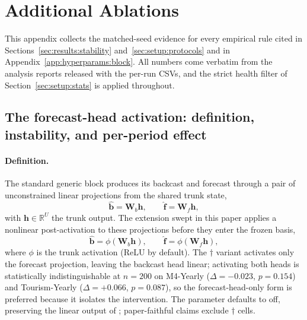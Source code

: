 %
%

\section{Additional Ablations}
\label{app:ablations}

This appendix collects the matched-seed evidence for every empirical rule
cited in Sections~\ref{sec:results:stability}
and~\ref{sec:setup:protocols} and in Appendix~\ref{app:hyperparams:block}.
All numbers come verbatim from the analysis reports released with the
per-run CSVs, and the strict health filter of
Section~\ref{sec:setup:stats} is applied throughout.

\subsection{The forecast-head activation: definition, instability, and
per-period effect}
\label{app:ablations:activeg}

\paragraph{Definition.} The standard generic block produces its backcast
and forecast through a pair of unconstrained linear projections from the
shared trunk state,
\[
  \hat{\mathbf{b}} = \mathbf{W}_b \mathbf{h},
  \qquad
  \hat{\mathbf{f}} = \mathbf{W}_f \mathbf{h},
\]
with $\mathbf{h} \in \mathbb{R}^{U}$ the trunk output. The extension swept
in this paper applies a nonlinear post-activation to these projections
before they enter the frozen basis,
\[
  \hat{\mathbf{b}} = \phi(\mathbf{W}_b \mathbf{h}),
  \qquad
  \hat{\mathbf{f}} = \phi(\mathbf{W}_f \mathbf{h}),
\]
where $\phi$ is the trunk activation (ReLU by default). The
$\dagger$ variant activates only the forecast projection, leaving the
backcast head linear; activating both heads is statistically
indistinguishable at $n = 200$ on M4-Yearly ($\Delta = -0.023$, $p = 0.154$)
and Tourism-Yearly ($\Delta = +0.066$, $p = 0.087$), so the forecast-head-only
form is preferred because it isolates the intervention. The parameter
defaults to off, preserving the linear output of
\citet{oreshkin2020nbeats}; paper-faithful claims exclude $\dagger$ cells.

